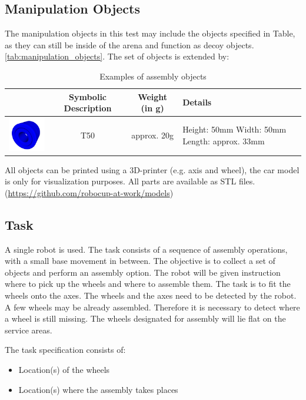\subsection{Manipulation Objects}
The manipulation objects in this test may include the objects specified in Table, as they can still be inside of the arena and function as decoy objects. \ref{tab:manipulation_objects}.
The set of objects is extended by:

\begin{table}[p]
\begin{tabular}{|c|c|c|p{5cm}|}
\hline 
 & Symbolic Description & Weight (in g) & Details \\ 
\hline 
\includegraphics[width=3cm]{./images/BAT_Tire.png}  & T50 & approx. 20g & Height: 50mm \newline
 Width: 50mm \newline
 Length: approx. 33mm \\ 
\hline 
\end{tabular} 

\label{tab:bat_objects}
\caption{Examples of assembly objects}
\end{table}

All objects can be printed using a 3D-printer (e.g. axis and wheel), the car model is only for visualization purposes. All parts are available as STL files. (\url{https://github.com/robocup-at-work/models})


\subsection{Task}
A single robot is used. The task consists of a sequence of assembly operations, with a small base movement in between. The objective is to collect a set of objects and perform an assembly option. The robot will be given instruction where to pick up the wheels and where to assemble them. The task is to fit the wheels onto the axes. The wheels and the axes need to be detected by the robot. A few wheels may be already assembled. Therefore it is necessary to detect where a wheel is still missing. The wheels designated for assembly will lie flat on the service areas.

\par
The task specification consists of: 
\begin{itemize}
	\item Location(s) of the wheels
	\item Location(s) where the assembly takes places
\end{itemize}

